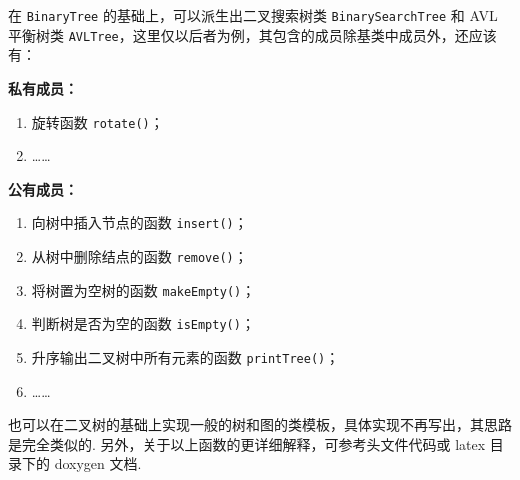 \documentclass[lang=cn,12pt]{elegantbook}
\begin{document}
在 \verb|BinaryTree| 的基础上，可以派生出二叉搜索树类 \verb|BinarySearchTree| 和 AVL 平衡树类 \verb|AVLTree|，这里仅以后者为例，其包含的成员除基类中成员外，还应该有：

\begin{framed}
  \textbf{私有成员：}

  \begin{enumerate}
    \item 旋转函数 \verb|rotate()|；
    \item ……
  \end{enumerate}

  \textbf{公有成员：}

  \begin{enumerate}
    \item 向树中插入节点的函数 \verb|insert()|；
    \item 从树中删除结点的函数 \verb|remove()|；
    \item 将树置为空树的函数 \verb|makeEmpty()|；
    \item 判断树是否为空的函数 \verb|isEmpty()|；
    \item 升序输出二叉树中所有元素的函数 \verb|printTree()|；
    \item ……
  \end{enumerate}
\end{framed}

也可以在二叉树的基础上实现一般的树和图的类模板，具体实现不再写出，其思路是完全类似的. 另外，关于以上函数的更详细解释，可参考头文件代码或 latex 目录下的 doxygen 文档.
\end{document}
